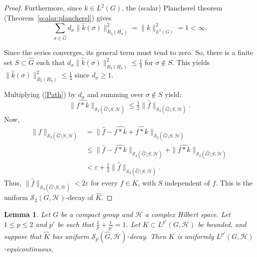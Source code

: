 \documentclass[10pt,a4paper]{amsart}
\newtheorem{lemma}[theorem]{Lemma}
\begin{document}
\begin{proof}
\noindent Furthermore, since $k\in L^2(G)$, the (scalar) Plancherel theorem (Theorem~\ref{scalar:plancherel}) gives
$$\sum_{\sigma\in \widehat{G}}
d_\sigma\|\widehat k(\sigma)\|_{B_2(H_\sigma)}^2=\|k\|_{L^2(G)}^2=1<\infty.$$


Since the series converges, its general term must tend to zero. So,  there is a finite set $S\subset\widehat{G}$ such that $d_\sigma\|\widehat k(\sigma)\|_{B_2(H_\sigma)}^2\le\frac{1}{4}$ for $\sigma\notin S$. This yields $\|\widehat k(\sigma)\|_{B_2(H_\sigma)}^2\le \frac{1}{4}$ since $d_\sigma\ge 1$. 

Multiplying (\ref{Path}) by
$d_\sigma$ and summing over $\sigma\notin S$ yield:
$$
\|\widehat{f*k}\|_{\mathscr{S}_2(\widehat{G}\setminus S,\mathcal{H})}\le\tfrac12\|\widehat f\|_{\mathscr{S}_2(\widehat{G}\setminus S,\mathcal{H})}.$$
Now, 
\begin{align*}
\|\widehat f\|_{\mathscr{S}_2(\widehat{G}\setminus S,\mathcal{H})}&=\|\widehat{f}-\widehat{f*k}+\widehat{f*k}\|_{\mathscr{S}_2(\widehat{G}\setminus S,\mathcal{H})}\\
&\le\|\widehat f-\widehat{f*k}\|_{\mathscr{S}_2(\widehat{G}\setminus S,\mathcal{H})}
+\|\widehat{f*k}\|_{\mathscr{S}_2(\widehat{G}\setminus S,\mathcal{H})}\\
&<\varepsilon +\frac{1}{2}\|\widehat f\|_{\mathscr{S}_2(\widehat{G}
\setminus S,\mathcal{H})}.
\end{align*}
Thus,  $\|\widehat f\|_{\mathscr{S}_2(\widehat{G}\setminus S,\mathcal{H})}<2\varepsilon$ for every $f\in K$, with $S$
independent of $f$. This is the uniform $\mathscr{S}_2(G,\mathcal{H})$-decay of $\widehat K$.
\end{proof}

\begin{lemma}\label{lem:equicont}
Let $G$ be a compact group and $\mathcal{H}$ a complex Hilbert space.  Let $1\le p\le 2$ and  $p'$ be such that $\frac{1}{p}+\frac{1}{p'}=1$.   Let $K\subset L^{p'}(G,\mathcal{H})$ be bounded,
and suppose that $\widehat K$ has uniform $\mathscr{S}_p(\widehat{G},\mathcal{H})$-decay. Then $K$ is uniformly
$L^{p'}(G,\mathcal{H})$-equicontinuous.
\end{lemma}
\end{document}
